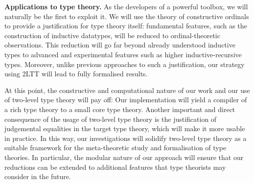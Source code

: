 \documentclass[a4paper,11pt]{article}
\renewcommand{\paragraph}[1]{\textbf{#1.}}
\begin{document}

\paragraph{Applications to type theory}
As the developers of a powerful toolbox, we will naturally be the first to exploit it.
We will use the theory of constructive ordinals to provide a justification for type theory itself: fundamental features, such as the construction of inductive datatypes, will be reduced to ordinal-theoretic observations.
This reduction will go far beyond already understood inductive types to advanced and experimental features such as higher inductive-recursive types.
%
Moreover, unlike previous approaches to such a justification, our strategy using 2LTT will lead to fully formalised results.
%
%

At this point, the constructive and computational nature of our work and our use of two-level type theory will pay off: Our implementation will yield a compiler of a rich type theory
to a small core type theory.
%
Another important and direct consequence of the usage of two-level type theory is the justification of judgemental equalities in the target type theory, which will make it more usable in practice.
%
In this way, our investigations will solidify two-level type theory as a suitable framework for the meta-theoretic study and formalisation of type theories.
In particular, the modular nature of our approach will ensure that our reductions can be extended to additional features that type theorists may consider in the future.


\end{document}
